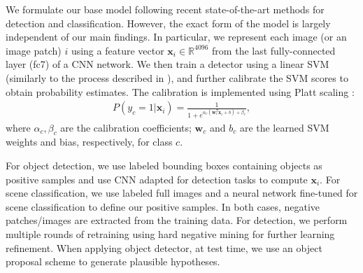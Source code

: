 \documentclass[runningheads]{llncs}
\newcommand{\RevComment} [1]{{\color{Red}{#1}}}
\begin{document}
We formulate our base model following recent state-of-the-art methods for detection and classification. However, the exact form of the model is largely independent of our main findings. In particular, we represent each image (or an image patch) $i$ using a feature vector $\mathbf{x}_i \in \mathbb{R}^{4096}$ from the last fully-connected layer (fc7) of a CNN network. We then train a detector using a linear SVM (similarly to the process described in \cite{Johnson2015}), and further calibrate the SVM scores to obtain probability estimates. 
The calibration is implemented using Platt scaling \cite{Platt99probabilisticoutputs}:
\begin{eqnarray*}
P(y_c=1|\mathbf{x}_i)=\frac{1}{1+e^{\alpha_c(\mathbf{w}_c^T \mathbf{x}_i + b) +\beta_c}},
\end{eqnarray*}
where $\alpha_c,\beta_c$ are the calibration coefficients; $\mathbf{w}_c$ and $b_c$ are the learned SVM weights and bias, respectively, for class $c$.

For object detection, we use labeled bounding boxes containing objects as positive samples and use CNN adapted for detection tasks \cite{girshick15fastrcnn} to compute $\mathbf{x}_i$. For scene classification, we use labeled full images and a neural network fine-tuned for scene classification \cite{NIPS2014_5349} to define our positive samples. In both cases, negative patches/images are extracted from the training data. For detection, we perform multiple rounds of retraining using hard negative mining for further learning refinement. When applying object detector, at test time, we use an object proposal scheme \cite{Uijlings2013} to generate plausible hypotheses. 
\end{document}
